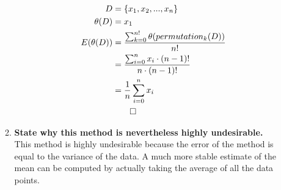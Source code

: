 \documentclass[12pt]{article}
\begin{document}
\begin{enumerate}
\begin{enumerate}
    \begin{equation}
    \begin{split}
      D& = \{x_1,x_2,...,x_n\} \\
      \theta(D)& = x_1 \\
      E(\theta(D))& = \frac{\sum_{k=0}^{n!} \theta(permutation_k(D))}{n!} \\
      & = \frac{\sum_{i=0}^{n} x_i \cdot (n-1)!}{n \cdot (n-1)!} \\
      & = \frac{1}{n}\sum_{i=0}^{n} x_i \\
      & \qed
    \end{split}
    \end{equation}
  \item \textbf{State why this method is nevertheless highly undesirable.} \\
  This method is highly undesirable because the error of the method is equal to the variance of the data. A much more stable estimate of the mean can be computed by actually taking the average of all the data points.
  \end{enumerate}
\end{enumerate}
\end{document}
